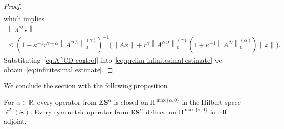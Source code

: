 \documentclass[10pt]{amsart}
\theoremstyle{definition}\newtheorem{defi}[theo]{Definition}\newtheorem{rema}[theo]{Remark}\newtheorem{exam}[theo]{Example}\newtheorem{nota}[theo]{Notation}
\renewcommand{\mathsf}{\mathrm}
\newcommand{\sfH}{\mathsf{H}}
\newcommand{\R}{\mathbb R}
\newcommand{\CD}{\mathcal{D}}
\newcommand{\CO}{\mathcal{O}}
\newcommand{\BE}{\mathbf E}
\newcommand{\BS}{\mathbf S}
\newcommand{\er}{r}
\begin{document}
\begin{proof}
\begin{align*}
\end{align*}
which implies
\begin{multline}\label{eq:A^CD control}
\left\|A^\CD x\right\|\\
\le \left(1 -\kappa^{-1}\er^{\gamma -\alpha}\left\|A^{\CO\CD}\right\|_0^{(\gamma)}\right)^{-1} \Big(\|A x\| +\er^\gamma\left\|A^{\CO\CD}\right\|_0^{(\gamma)}\left(1 +\kappa^{-1}\left\|A^\CD\right\|_0^{(\alpha)}\right)\|x\|\Big).
\end{multline}
Substituting~\eqref{eq:A^CD control} into~\eqref{eq:prelim infinitesimal estimate} we obtain~\eqref{eq:infinitesimal estimate}.
\end{proof}


We conclude the section with the following proposition.

\begin{prop}\label{prop:closedness and self-adjointness}
For $\alpha \in\R$, every operator from $\BE\BS^\alpha$ is closed on $\sfH^{\max\{\alpha, 0\}}$ in the Hilbert space $\ell^2(\Xi)$. Every symmetric operator from $\BE\BS^\alpha$ defined on $\sfH^{\max\{\alpha, 0\}}$ is self-adjoint.
\end{prop}
\end{document}
